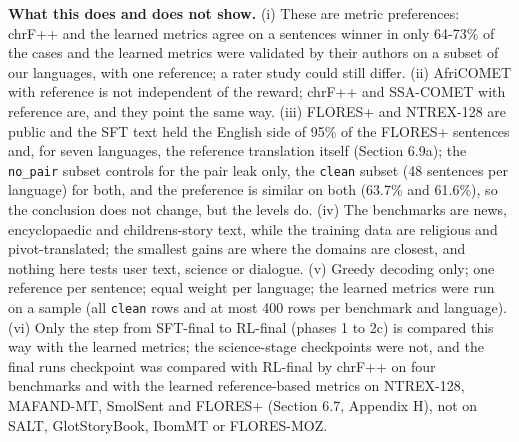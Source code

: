\textbf{What this does and does not show.} (i) These are metric preferences: chrF++ and the learned metrics agree on a sentence\textquotesingle s winner in only 64-73\% of the cases and the learned metrics were validated by their authors on a subset of our languages, with one reference; a rater study could still differ. (ii) AfriCOMET with reference is not independent of the reward; chrF++ and SSA-COMET with reference are, and they point the same way. (iii) FLORES+ and NTREX-128 are public and the SFT text held the English side of 95\% of the FLORES+ sentences and, for seven languages, the reference translation itself (Section 6.9a); the \texttt{no\_pair} subset controls for the pair leak only, the \texttt{clean} subset (48 sentences per language) for both, and the preference is similar on both (63.7\% and 61.6\%), so the conclusion does not change, but the levels do. (iv) The benchmarks are news, encyclopaedic and children\textquotesingle s-story text, while the training data are religious and pivot-translated; the smallest gains are where the domains are closest, and nothing here tests user text, science or dialogue. (v) Greedy decoding only; one reference per sentence; equal weight per language; the learned metrics were run on a sample (all \texttt{clean} rows and at most 400 rows per benchmark and language). (vi) Only the step from SFT-final to RL-final (phases 1 to 2c) is compared this way with the learned metrics; the science-stage checkpoints were not, and the final run\textquotesingle s checkpoint was compared with RL-final by chrF++ on four benchmarks and with the learned reference-based metrics on NTREX-128, MAFAND-MT, SmolSent and FLORES+ (Section 6.7, Appendix H), not on SALT, GlotStoryBook, IbomMT or FLORES-MOZ.

